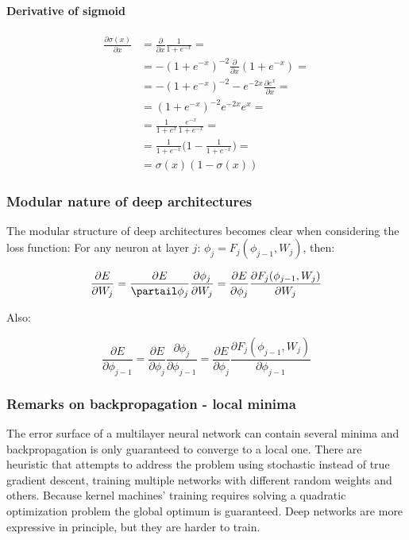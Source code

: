 			\paragraph{Derivative of sigmoid}

			\begin{align*}
				\frac{\partial\sigma(x)}{\partial x} &= \frac{\partial}{\partial x}\frac{1}{1+e^{-x}}=\\
								     &=-(1+e^{-x})^{-2}\frac{\partial}{\partial x}(1+e^{-x})=\\
								     &=-(1+e^{-x})^{-2}-e^{-2x}\frac{\partial e^x}{\partial x}=\\
								     &=(1+e^{-x})^{-2}e^{-2x}e^x=\\
								     &=\frac{1}{1+e^x}\frac{e^{-x}}{1+e^{-x}}=\\
								     &=\frac{1}{1+e^{-x}}\biggl(1-\frac{1}{1+e^{-x}}\biggr)=\\
								     &=\sigma(x)(1-\sigma(x))
			\end{align*}

		\subsubsection{Modular nature of deep architectures}
		The modular structure of deep architectures becomes clear when considering the loss function:
		For any neuron at layer $j$: $\phi_j = F_j(\phi_{j-1},W_j)$, then:

		$$\frac{\partial E}{\partial W_j} = \frac{\partial E}{\partail\phi_j}\frac{\partial\phi_j}{\partial W_j} = \frac{\partial E}{\partial \phi_j}\frac{\partial F_j(\phi_{j-1},W_j)}{\partial W_j}$$

		Also:

		$$\frac{\partial E}{\partial\phi_{j-1}} = \frac{\partial E}{\partial \phi_j}\frac{\partial \phi_j}{\partial\phi_{j-1}} = \frac{\partial E}{\partial \phi_j}\frac{\partial F_j(\phi_{j-1},W_j)}{\partial\phi_{j-1}}$$

		\subsubsection{Remarks on backpropagation - local minima}
		The error surface of a multilayer neural network can contain several minima and backpropagation is only guaranteed to converge to a local one.
		There are heuristic that attempts to address the problem using stochastic instead of true gradient descent, training multiple networks with different random weights and others.
		Because kernel machines' training requires solving a quadratic optimization problem the global optimum is guaranteed.
		Deep networks are more expressive in principle, but they are harder to train.

